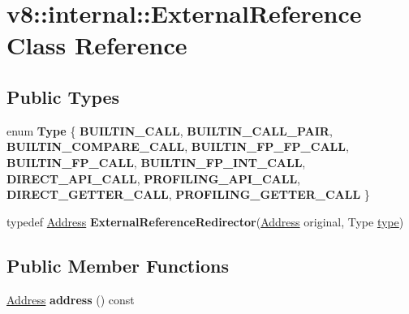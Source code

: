 \hypertarget{classv8_1_1internal_1_1ExternalReference}{}\section{v8\+:\+:internal\+:\+:External\+Reference Class Reference}
\label{classv8_1_1internal_1_1ExternalReference}
\subsection*{Public Types}
\begin{DoxyCompactItemize}
\item 
\mbox{\label{classv8_1_1internal_1_1ExternalReference_adff3beccbe252a111d27e4d3a845575b}} 
enum {\bfseries Type} \{ \newline
{\bfseries B\+U\+I\+L\+T\+I\+N\+\_\+\+C\+A\+LL}, 
{\bfseries B\+U\+I\+L\+T\+I\+N\+\_\+\+C\+A\+L\+L\+\_\+\+P\+A\+IR}, 
{\bfseries B\+U\+I\+L\+T\+I\+N\+\_\+\+C\+O\+M\+P\+A\+R\+E\+\_\+\+C\+A\+LL}, 
{\bfseries B\+U\+I\+L\+T\+I\+N\+\_\+\+F\+P\+\_\+\+F\+P\+\_\+\+C\+A\+LL}, 
\newline
{\bfseries B\+U\+I\+L\+T\+I\+N\+\_\+\+F\+P\+\_\+\+C\+A\+LL}, 
{\bfseries B\+U\+I\+L\+T\+I\+N\+\_\+\+F\+P\+\_\+\+I\+N\+T\+\_\+\+C\+A\+LL}, 
{\bfseries D\+I\+R\+E\+C\+T\+\_\+\+A\+P\+I\+\_\+\+C\+A\+LL}, 
{\bfseries P\+R\+O\+F\+I\+L\+I\+N\+G\+\_\+\+A\+P\+I\+\_\+\+C\+A\+LL}, 
\newline
{\bfseries D\+I\+R\+E\+C\+T\+\_\+\+G\+E\+T\+T\+E\+R\+\_\+\+C\+A\+LL}, 
{\bfseries P\+R\+O\+F\+I\+L\+I\+N\+G\+\_\+\+G\+E\+T\+T\+E\+R\+\_\+\+C\+A\+LL}
 \}
\item 
\mbox{\label{classv8_1_1internal_1_1ExternalReference_acd897747072a3127f568d336b3c23f1c}} 
typedef \mbox{\hyperlink{classuintptr__t}{Address}} {\bfseries External\+Reference\+Redirector}(\mbox{\hyperlink{classuintptr__t}{Address}} original, Type \mbox{\hyperlink{classstd_1_1conditional_1_1type}{type}})
\end{DoxyCompactItemize}
\subsection*{Public Member Functions}
\begin{DoxyCompactItemize}
\item 
\mbox{\label{classv8_1_1internal_1_1ExternalReference_aadf8c6aed72f2104bd107b194c7d86a8}} 
\mbox{\hyperlink{classuintptr__t}{Address}} {\bfseries address} () const
\end{DoxyCompactItemize}
